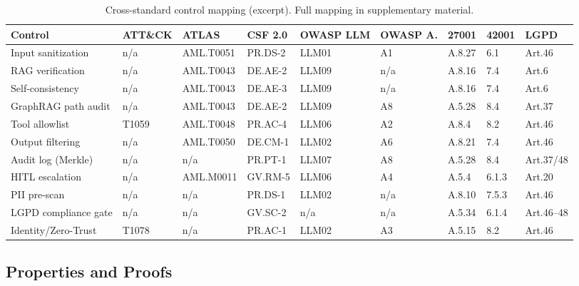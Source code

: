 \documentclass[journal]{IEEEtran}
\begin{document}
\begin{table}[!t]
\renewcommand{\arraystretch}{1.2}
\caption{Cross-standard control mapping (excerpt). Full mapping in supplementary material.}
\label{tab:mapping}
\centering
\scriptsize
\begin{tabular}{lllllllll}
\toprule
\textbf{Control} & \textbf{ATT\&CK} & \textbf{ATLAS} & \textbf{CSF 2.0} & \textbf{OWASP LLM} & \textbf{OWASP A.} & \textbf{27001} & \textbf{42001} & \textbf{LGPD} \\
\midrule
Input sanitization   & n/a    & AML.T0051 & PR.DS-2 & LLM01 & A1  & A.8.27 & 6.1   & Art.46 \\
RAG verification     & n/a    & AML.T0043 & DE.AE-2 & LLM09 & n/a & A.8.16 & 7.4   & Art.6  \\
Self-consistency     & n/a    & AML.T0043 & DE.AE-3 & LLM09 & n/a & A.8.16 & 7.4   & Art.6  \\
GraphRAG path audit  & n/a    & AML.T0043 & DE.AE-2 & LLM09 & A8  & A.5.28 & 8.4   & Art.37 \\
Tool allowlist       & T1059  & AML.T0048 & PR.AC-4 & LLM06 & A2  & A.8.4  & 8.2   & Art.46 \\
Output filtering     & n/a    & AML.T0050 & DE.CM-1 & LLM02 & A6  & A.8.21 & 7.4   & Art.46 \\
Audit log (Merkle)   & n/a    & n/a       & PR.PT-1 & LLM07 & A8  & A.5.28 & 8.4   & Art.37/48 \\
HITL escalation      & n/a    & AML.M0011 & GV.RM-5 & LLM06 & A4  & A.5.4  & 6.1.3 & Art.20 \\
PII pre-scan         & n/a    & n/a       & PR.DS-1 & LLM02 & n/a & A.8.10 & 7.5.3 & Art.46 \\
LGPD compliance gate & n/a    & n/a       & GV.SC-2 & n/a   & n/a & A.5.34 & 6.1.4 & Art.46--48 \\
Identity/Zero-Trust  & T1078  & n/a       & PR.AC-1 & LLM02 & A3  & A.5.15 & 8.2   & Art.46 \\
\bottomrule
\end{tabular}
\end{table}

\subsection{Properties and Proofs}
\label{ssec:properties}
\end{document}
